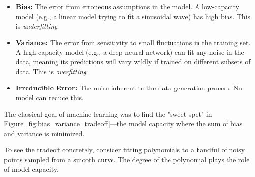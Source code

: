 \documentclass{tufte-handout}
\begin{document}
\begin{itemize}[leftmargin=*, itemsep=2pt]
    \item \textbf{Bias:} The error from erroneous assumptions in the model. A low-capacity model (e.g., a linear model trying to fit a sinusoidal wave) has high bias. This is \textit{underfitting}.
    \item \textbf{Variance:} The error from sensitivity to small fluctuations in the training set. A high-capacity model (e.g., a deep neural network) can fit any noise in the data, meaning its predictions will vary wildly if trained on different subsets of data. This is \textit{overfitting}.
    \item \textbf{Irreducible Error:} The noise inherent to the data generation process. No model can reduce this.
\end{itemize}

The classical goal of machine learning was to find the "sweet spot" in Figure~\ref{fig:bias_variance_tradeoff}—the model capacity where the sum of bias and variance is minimized.

To see the tradeoff concretely, consider fitting polynomials to a handful of noisy points sampled from a smooth curve. The degree of the polynomial plays the role of model capacity.
\end{document}
